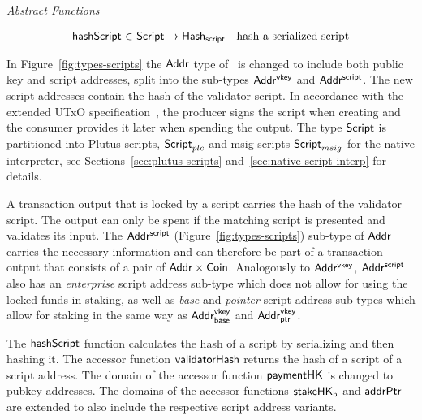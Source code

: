 \documentclass[11pt,a4paper,dvipsnames]{article}
\newcommand{\Addr}{\type{Addr}}
\newcommand{\AddrVKey}{\type{Addr^{vkey}}}
\newcommand{\Coin}{\type{Coin}}
\newcommand{\AddrVKeyB}{\type{Addr^{vkey}_{base}}}
\newcommand{\AddrVKeyP}{\type{Addr^{vkey}_{ptr}}}
\newcommand{\AddrScr}{\type{Addr^{script}}}
\newcommand{\HashScr}{\type{Hash_{script}}}
\newcommand{\Script}{\type{Script}}
\newcommand{\ScriptPlutus}{\Script_{plc}}
\newcommand{\ScriptMSig}{\Script_{msig}}
\theoremstyle{definition}
\begin{document}
\begin{figure*}[hbt]
  \emph{Abstract Functions}

  \begin{equation*}
    \begin{array}{r@{~\in~}lr}
      \fun{hashScript} & \Script \to \HashScr & \text{hash a serialized script}
    \end{array}
  \end{equation*}

  \caption{Types for Scripts and Script Addresses}
  \label{fig:types-scripts}
\end{figure*}

In Figure~\ref{fig:types-scripts} the $\Addr$ type of~\cite{shelley_formal_spec}
is changed to include both public key and script addresses, split into the
sub-types $\AddrVKey$ and $\AddrScr$. The new script addresses contain the hash
of the validator script. In accordance with the extended UTxO
specification~\cite{plutus_eutxo}, the producer signs the script when creating
and the consumer provides it later when spending the output. The type $\Script$
is partitioned into Plutus scripts, $\ScriptPlutus$ and msig scripts
$\ScriptMSig$ for the native interpreter, see Sections~\ref{sec:plutus-scripts}
and~\ref{sec:native-script-interp} for details.

A transaction output that is locked by a script carries the hash of the
validator script. The output can only be spent if the matching script is
presented and validates its input. The $\AddrScr$
(Figure~\ref{fig:types-scripts}) sub-type of $\Addr$ carries the necessary
information and can therefore be part of a transaction output that consists of a
pair of $\Addr\times\Coin$. Analogously to $\AddrVKey$, $\AddrScr$ also has an
\emph{enterprise} script address sub-type which does not allow for using the
locked funds in staking, as well as \emph{base} and \emph{pointer} script
address sub-types which allow for staking in the same way as $\AddrVKeyB$ and
$\AddrVKeyP$.

The $\mathsf{hashScript}$ function calculates the hash of a script by serializing
and then hashing it. The accessor function $\mathsf{validatorHash}$ returns the
hash of a script of a script address. The domain of the accessor function
$\mathsf{paymentHK}$ is changed to pubkey addresses. The domains of the accessor
functions $\mathsf{stakeHK_b}$ and $\mathsf{addrPtr}$ are extended to also include the
respective script address variants.
\end{document}
